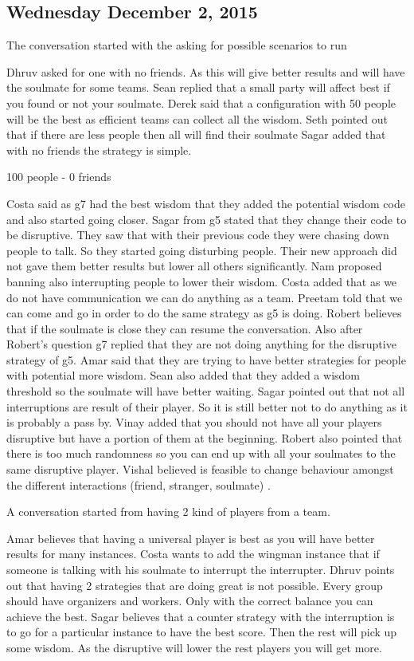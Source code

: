 \subsection{Wednesday December 2, 2015}
The conversation started with the asking for possible scenarios to run

Dhruv asked for one with no friends. As this will give better results and will have the soulmate for some teams.
Sean replied that a small party will affect best if you found or not your soulmate.
Derek said that a configuration with 50 people will be the best as efficient teams can collect all the wisdom.
Seth pointed out that if there are less people then all will find their soulmate
Sagar added that with no friends the strategy is simple.


100 people - 0 friends

Costa said as g7 had the best wisdom that they added the potential wisdom code and also started going closer.
Sagar from g5 stated that they change their code to be disruptive. They saw that with their previous code they were chasing down people to talk. So they started going disturbing people. Their new approach did not gave them better results but lower all others significantly.
Nam proposed banning also interrupting people to lower their wisdom.
Costa added that as we do not have communication we can do anything as a team.
Preetam told that we can come and go in order to do the same strategy as g5 is doing.
Robert believes that if the soulmate is close they can resume the conversation.
Also after Robert’s question g7 replied that they are not doing anything for the disruptive strategy of g5.
Amar said that they are trying to have better strategies for people with potential more wisdom.
Sean also added that they added a wisdom threshold so the soulmate will have better waiting.
Sagar pointed out that not all interruptions are result of their player. So it is still better not to do anything as it is probably a pass by.
Vinay added that you should not have all your players disruptive but have a portion of them at the beginning.
Robert also pointed that there is too much randomness so you can end up with all your soulmates to the same disruptive player.
Vishal believed is feasible to change behaviour amongst the different interactions (friend, stranger, soulmate) .

A conversation started from having 2 kind of players from a team.

Amar believes that having a universal player is best as you will have better results for many instances.
Costa wants to add the wingman instance that if someone is talking with his soulmate to interrupt the interrupter. 
Dhruv points out that having 2 strategies that are doing great is not possible. Every group should have organizers and workers. Only with the correct balance you can achieve the best.
Sagar believes that a counter strategy with the interruption is to go for a particular instance to have the best score. Then the rest will pick up some wisdom. As the disruptive will lower the rest players you will get more.

